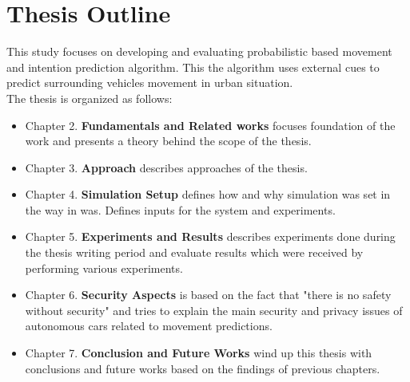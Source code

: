\section{Thesis Outline}

This study focuses on developing and evaluating probabilistic based movement and intention prediction algorithm. This
the algorithm uses external cues to predict surrounding vehicles movement in urban situation. \\

The thesis is organized as follows:
\begin{itemize}
	\item Chapter 2. \textbf{Fundamentals and Related works} focuses foundation of the work and presents a theory behind the scope of the thesis.
	\item Chapter 3. \textbf{Approach} describes approaches of the thesis.
	\item Chapter 4. \textbf{Simulation Setup} defines how and why simulation was set in the way in was. Defines inputs for the system and experiments.
	\item Chapter 5. \textbf{Experiments and Results} describes experiments done during the thesis writing period and evaluate results which were received by performing various experiments.
	\item Chapter 6. \textbf{Security Aspects} is based on the fact that "there is no safety without security" and tries to explain the main security and privacy issues of autonomous cars related to movement predictions.
	\item Chapter 7. \textbf{Conclusion and Future Works} wind up this thesis with conclusions and future works based on the findings of previous chapters.
\end{itemize}